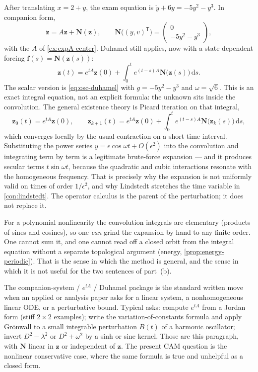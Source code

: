 \documentclass[11pt,a4paper]{article}
\begin{document}
\begin{example}
\label{ex:duhamel-p6}
After translating \(x=2+y\), the exam equation is \(\ddot y+6y=-5y^{2}-y^{3}\). In companion form,
\[
\dot{\mathbf{z}}
=
A\mathbf{z}+\mathbf{N}(\mathbf{z}),
\qquad
\mathbf{N}\bigl((y,v)^{\mathsf T}\bigr)
=
\begin{pmatrix} 0 \\ -5y^{2}-y^{3} \end{pmatrix},
\]
with the \(A\) of \cref{ex:expA-center}. Duhamel still applies, now with a state-dependent forcing \(\mathbf{f}(s)=\mathbf{N}(\mathbf{z}(s))\):
\[
\mathbf{z}(t)
=
e^{tA}\mathbf{z}(0)
+
\int_{0}^{t} e^{(t-s)A}\mathbf{N}\bigl(\mathbf{z}(s)\bigr)\,\mathrm{d}s.
\]
The scalar version is \eqref{eq:osc-duhamel} with \(g=-5y^{2}-y^{3}\) and \(\omega=\sqrt{6}\). This is an exact integral equation, not an explicit formula: the unknown sits inside the convolution. The general existence theory is Picard iteration on that integral,
\[
\mathbf{z}_{0}(t)=e^{tA}\mathbf{z}(0),
\qquad
\mathbf{z}_{k+1}(t)
=
e^{tA}\mathbf{z}(0)
+
\int_{0}^{t} e^{(t-s)A}\mathbf{N}\bigl(\mathbf{z}_{k}(s)\bigr)\,\mathrm{d}s,
\]
which converges locally by the usual contraction on a short time interval. Substituting the power series \(y=\epsilon\cos\omega t+O(\epsilon^{2})\) into the convolution and integrating term by term is a legitimate brute-force expansion --- and it produces secular terms \(t\sin\omega t\), because the quadratic and cubic interactions resonate with the homogeneous frequency. That is precisely why the expansion is not uniformly valid on times of order \(1/\epsilon^{2}\), and why Lindstedt stretches the time variable in \cref{con:lindstedt}. The operator calculus is the parent of the perturbation; it does not replace it.

For a polynomial nonlinearity the convolution integrals are elementary (products of sines and cosines), so one \emph{can} grind the expansion by hand to any finite order. One cannot sum it, and one cannot read off a closed orbit from the integral equation without a separate topological argument (energy, \cref{prop:energy-periodic}). That is the sense in which the method is general, and the sense in which it is not useful for the two sentences of part~(b).
\end{example}

\begin{remark}
\label{rem:yau-eAt}
The companion-system / \(e^{tA}\) / Duhamel package is the standard written move when an applied or analysis paper asks for a linear system, a nonhomogeneous linear ODE, or a perturbative bound. Typical asks: compute \(e^{tA}\) from a Jordan form (stiff \(2\times 2\) examples); write the variation-of-constants formula and apply Gr\"onwall to a small integrable perturbation \(B(t)\) of a harmonic oscillator; invert \(D^{2}-\lambda^{2}\) or \(D^{2}+\omega^{2}\) by a sinh or sine kernel. Those are this paragraph, with \(\mathbf{N}\) linear in \(\mathbf{z}\) or independent of \(\mathbf{z}\). The present CAM question is the nonlinear conservative case, where the same formula is true and unhelpful as a closed form.
\end{remark}
\end{document}
